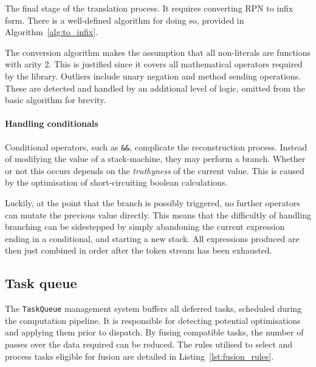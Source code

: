 The final stage of the translation process. It requires converting \ac{RPN} to infix form.
There is a well-defined algorithm for doing so, provided in Algorithm~\ref{alg:to_infix}.

The conversion algorithm makes the assumption that all non-literals are functions with arity 2. This is justified since it covers all mathematical operators required by the library. Outliers include unary negation and method sending operations. These are detected and handled by an additional level of logic, omitted from the basic algorithm for brevity.

\paragraph*{Handling conditionals}
Conditional operators, such as \verb|&&|, complicate the reconstruction process. Instead of modifying the value of a stack-machine, they may perform a branch. Whether or not this occurs depends on the \emph{truthyness} of the current value. This is caused by the optimisation of short-circuiting boolean calculations.

Luckily, at the point that the branch is possibly triggered, no further operators can mutate the previous value directly. This means that the difficultly of handling branching can be sidestepped by simply abandoning the current expression ending in a conditional, and starting a new stack. All expressions produced are then just combined in order after the token stream has been exhausted.

\subsection{Task queue}
The \verb|TaskQueue| management system buffers all deferred tasks, scheduled during the computation pipeline. It is responsible for detecting potential optimisations and applying them prior to dispatch.
By fusing compatible tasks, the number of passes over the data required can be reduced. The rules utilised to select and process tasks eligible for fusion are detailed in Listing~\ref{lst:fusion_rules}.

